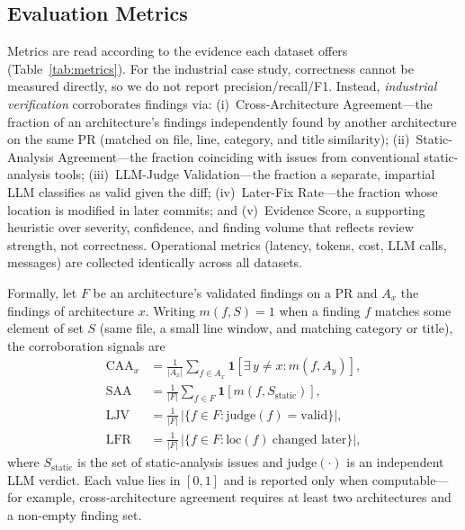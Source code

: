 \documentclass[conference]{IEEEtran}
\newcommand{\ind}{\mathbf{1}}
\begin{document}
\subsection{Evaluation Metrics}
Metrics are read according to the evidence each dataset offers
(Table~\ref{tab:metrics}). For the industrial case study, correctness cannot
be measured directly, so we do not report precision/recall/F1. Instead,
\emph{industrial verification} corroborates findings via: (i)~Cross-Architecture
Agreement---the fraction of an architecture's findings independently found by
another architecture on the same PR (matched on file, line, category, and
title similarity); (ii)~Static-Analysis Agreement---the fraction coinciding
with issues from conventional static-analysis tools; (iii)~LLM-Judge
Validation---the fraction a separate, impartial LLM classifies as valid given
the diff; (iv)~Later-Fix Rate---the fraction whose location is modified in
later commits; and (v)~Evidence Score, a supporting heuristic over severity,
confidence, and finding volume that reflects review strength, not
correctness. Operational metrics (latency, tokens, cost, LLM calls,
messages) are collected identically across all datasets.

Formally, let $F$ be an architecture's validated findings on a PR and $A_x$
the findings of architecture $x$. Writing $m(f, S) = 1$ when a finding $f$
matches some element of set $S$ (same file, a small line window, and
matching category or title), the corroboration signals are
\begin{align}
\mathrm{CAA}_x &= \frac{1}{|A_x|}\sum_{f \in A_x}
   \ind\!\left[\exists\, y \neq x : m(f, A_y)\right], \\
\mathrm{SAA} &= \frac{1}{|F|}\sum_{f \in F}
   \ind\!\left[m(f, S_{\text{static}})\right], \\
\mathrm{LJV} &= \frac{1}{|F|}\,\big|\{f \in F : \mathrm{judge}(f) = \text{valid}\}\big|, \\
\mathrm{LFR} &= \frac{1}{|F|}\,\big|\{f \in F : \mathrm{loc}(f)\ \text{changed later}\}\big|,
\end{align}
where $S_{\text{static}}$ is the set of static-analysis issues and
$\mathrm{judge}(\cdot)$ is an independent LLM verdict. Each value lies in
$[0,1]$ and is reported only when computable---for example,
cross-architecture agreement requires at least two architectures and a
non-empty finding set.
\end{document}
